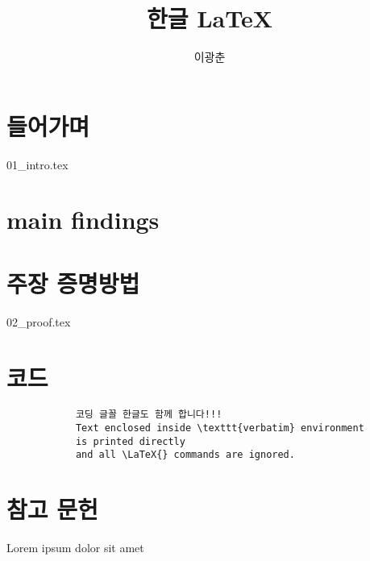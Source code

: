 \documentclass{article}
\begin{document}
	\title{한글 \LaTeX}
	\author{이광춘}
	\maketitle
	
	\abstract{}
		{\selectfont
			\lipsum[1]	
		}
	\section{들어가며}
		{
			{01_intro.tex}
		}
	\section{main findings}
		\lipsum[1-2]
	\section{주장 증명방법}
			{02_proof.tex}
	\section{코드}
		\begin{verbatim}
			코딩 글꼴 한글도 함께 합니다!!!
			Text enclosed inside \texttt{verbatim} environment 
			is printed directly 
			and all \LaTeX{} commands are ignored.
		\end{verbatim}
	\section{참고 문헌}
			Lorem \autocite{sigfridsson}
			ipsum \autocite{worman}
			dolor \autocite{nussbaum}
			sit \autocite{sigfridsson}
			amet \autocite{geer}	
	\printbibliography
\end{document}
